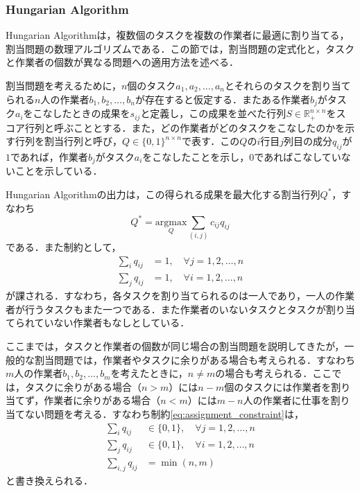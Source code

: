         \subsubsection{Hungarian Algorithm}
        Hungarian Algorithm\cite{kuhn1955hungarian}は，複数個のタスクを複数の作業者に最適に割り当てる，割当問題の数理アルゴリズムである．この節では，割当問題の定式化と，タスクと作業者の個数が異なる問題への適用方法を述べる．
        
        割当問題を考えるために，$n$個のタスク$a_1, a_2, \dots, a_n$とそれらのタスクを割り当てられる$n$人の作業者$b_1, b_2, \dots, b_n$が存在すると仮定する．またある作業者$b_j$がタスク$a_i$をこなしたときの成果を$s_{ij}$と定義し，この成果を並べた行列$S \in \mathbb{R}_+^{n \times n}$をスコア行列と呼ぶこととする．また，どの作業者がどのタスクをこなしたのかを示す行列を割当行列と呼び，$Q \in \{0, 1\}^{n \times n}$で表す．この$Q$の$i$行目$j$列目の成分$q_{ij}$が$1$であれば，作業者$b_j$がタスク$a_i$をこなしたことを示し，$0$であればこなしていないことを示している．

        Hungarian Algorithmの出力は，この得られる成果を最大化する割当行列$Q^*$，すなわち
        \begin{equation}
            \label{eq:assignment_objective}
            Q^* = \underset{Q}{\text{argmax}} \sum_{(i,j)} c_{ij} q_{ij}
        \end{equation}
        である．また制約として，
        \begin{equation}
            \label{eq:assignment_constraint}
            \begin{aligned}
                \sum_i q_{ij} &= 1, \quad \forall j = 1, 2, \dots, n
                \\ \sum_j q_{ij} &= 1, \quad \forall i = 1, 2, \dots, n
            \end{aligned}
        \end{equation}
        が課される．すなわち，各タスクを割り当てられるのは一人であり，一人の作業者が行うタスクもまた一つである．また作業者のいないタスクとタスクが割り当てられていない作業者もなしとしている．

        ここまでは，タスクと作業者の個数が同じ場合の割当問題を説明してきたが，一般的な割当問題では，作業者やタスクに余りがある場合も考えられる．すなわち$m$人の作業者$b_1, b_2, \dots, b_m$を考えたときに，$n \neq m$の場合も考えられる．ここでは，タスクに余りがある場合（$n > m$）には$n-m$個のタスクには作業者を割り当てず，作業者に余りがある場合（$n < m$）には$m-n$人の作業者に仕事を割り当てない問題を考える．すなわち制約\ref{eq:assignment_constraint}は，
        \begin{equation}
            \label{eq:assignment_constraint2}
            \begin{aligned}
                \sum_i q_{ij} &\in \{0, 1\}, \quad \forall j = 1, 2, \dots, n
                \\ \sum_j q_{ij} &\in \{0, 1\}, \quad \forall i = 1, 2, \dots, n
                \\ \sum_{i,j} q_{ij} &= \min (n, m)
            \end{aligned}
        \end{equation}
        と書き換えられる．

